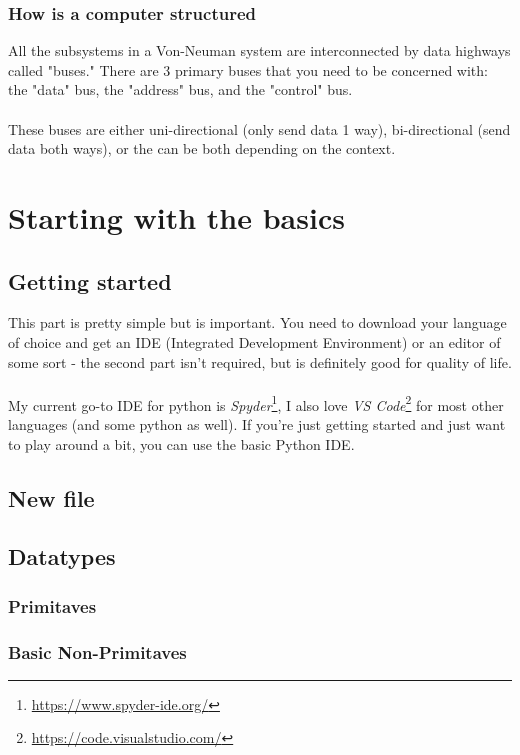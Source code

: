 \documentclass[12pt,a4paper]{book}
\begin{document}
			\subsection{How is a computer structured}
			All the subsystems in a Von-Neuman system are interconnected by data highways called "buses." There are 3 primary buses that you need to be concerned with: the "data" bus, the "address" bus, and the  "control" bus.
			\\\\
			These buses are either uni-directional (only send data 1 way), bi-directional (send data both ways), or the can be both depending on the context.
	\chapter{Starting with the basics}  \label{chap:basics}
		\section{Getting started}
			This part is pretty simple but is important. You need to download your language of choice and get an IDE (Integrated Development Environment) or an editor of some sort - the second part isn't required, but is definitely good for quality of life.
			\\\\
			My current go-to IDE for python is \textit{Spyder}\footnote{\url{https://www.spyder-ide.org/}}, I also love \textit{VS Code}\footnote{\url{https://code.visualstudio.com/}} for most other languages (and some python as well). If you're just getting started and just want to play around a bit, you can use the basic Python IDE.
		\section{New file}
		\section{Datatypes}
			\subsection{Primitaves} 
			\subsection{Basic Non-Primitaves} 
\end{document}

